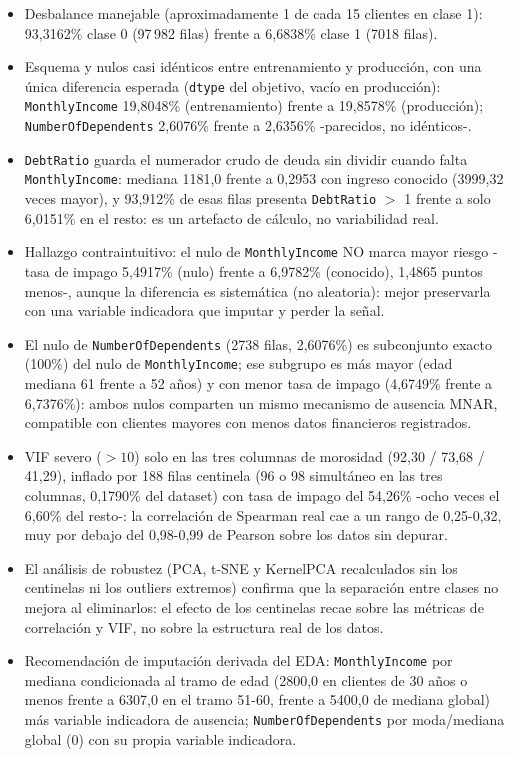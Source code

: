 \documentclass[11pt,a4paper]{article}
\begin{document}
\begin{itemize}
\item Desbalance manejable (aproximadamente 1 de cada 15 clientes en clase 1): 93,3162\% clase 0 (97\,982 filas) frente a 6,6838\% clase 1 (7018 filas).
\item Esquema y nulos casi id\'enticos entre entrenamiento y producci\'on, con una \'unica diferencia esperada (\texttt{dtype} del objetivo, vac\'io en producci\'on): \texttt{MonthlyIncome} 19,8048\% (entrenamiento) frente a 19,8578\% (producci\'on); \texttt{NumberOfDependents} 2,6076\% frente a 2,6356\% -parecidos, no id\'enticos-.
\item \texttt{DebtRatio} guarda el numerador crudo de deuda sin dividir cuando falta \texttt{MonthlyIncome}: mediana 1181,0 frente a 0,2953 con ingreso conocido (3999,32 veces mayor), y 93,912\% de esas filas presenta \texttt{DebtRatio} $>$ 1 frente a solo 6,0151\% en el resto: es un artefacto de c\'alculo, no variabilidad real.
\item Hallazgo contraintuitivo: el nulo de \texttt{MonthlyIncome} NO marca mayor riesgo -tasa de impago 5,4917\% (nulo) frente a 6,9782\% (conocido), 1,4865 puntos menos-, aunque la diferencia es sistem\'atica (no aleatoria): mejor preservarla con una variable indicadora que imputar y perder la se\~nal.
\item El nulo de \texttt{NumberOfDependents} (2738 filas, 2,6076\%) es subconjunto exacto (100\%) del nulo de \texttt{MonthlyIncome}; ese subgrupo es m\'as mayor (edad mediana 61 frente a 52 a\~nos) y con menor tasa de impago (4,6749\% frente a 6,7376\%): ambos nulos comparten un mismo mecanismo de ausencia MNAR, compatible con clientes mayores con menos datos financieros registrados.
\item VIF severo ($>10$) solo en las tres columnas de morosidad (92,30 / 73,68 / 41,29), inflado por 188 filas centinela (96 o 98 simult\'aneo en las tres columnas, 0,1790\% del dataset) con tasa de impago del 54,26\% -ocho veces el 6,60\% del resto-: la correlaci\'on de Spearman real cae a un rango de 0,25-0,32, muy por debajo del 0,98-0,99 de Pearson sobre los datos sin depurar.
\item El an\'alisis de robustez (PCA, t-SNE y KernelPCA recalculados sin los centinelas ni los outliers extremos) confirma que la separaci\'on entre clases no mejora al eliminarlos: el efecto de los centinelas recae sobre las m\'etricas de correlaci\'on y VIF, no sobre la estructura real de los datos.
\item Recomendaci\'on de imputaci\'on derivada del EDA: \texttt{MonthlyIncome} por mediana condicionada al tramo de edad (2800,0 en clientes de 30 a\~nos o menos frente a 6307,0 en el tramo 51-60, frente a 5400,0 de mediana global) m\'as variable indicadora de ausencia; \texttt{NumberOfDependents} por moda/mediana global (0) con su propia variable indicadora.
\end{itemize}
\end{document}
